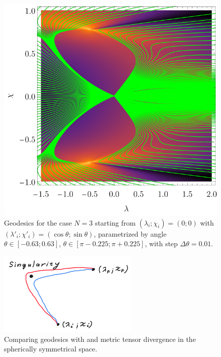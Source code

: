 \begin{figure}[H]
    \centering
    \includegraphics{../img/N=3_geodesics.pdf}
    \caption{Geodesics for the case $N=3$ starting from $(\lambda_i;\chi_i)=(0;0)$ with $(\lambda'_i;\chi'_i)=(\cos\theta;\sin\theta)$, parametrized by angle $\theta\in [-0.63;0.63]$, $\theta\in [\pi-0.225;\pi+0.225]$, with step $\Delta\theta=0.01$.}
    \label{fig:N=3_geodesics}    
\end{figure}
\begin{figure}[H]
    \centering
    \includegraphics[width=0.6\textwidth]{../img/geodesicsinGR.png}
    \caption{Comparing geodesics with  and  metric tensor divergence in the spherically symmetrical space. }
    \label{fig:geodesicsinGR}
\end{figure}

